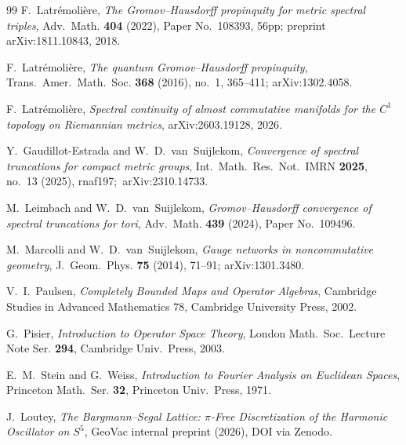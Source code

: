 \documentclass[11pt,a4paper]{article}
\theoremstyle{plain}
\theoremstyle{definition}
\begin{document}
\begin{thebibliography}{99}
F.~Latr\'emoli\`ere,
\newblock \emph{The Gromov--Hausdorff propinquity for metric spectral
triples},
\newblock Adv.~Math. \textbf{404} (2022), Paper No.~108393, 56pp;
\newblock preprint arXiv:1811.10843, 2018.

F.~Latr\'emoli\`ere,
\newblock \emph{The quantum Gromov--Hausdorff propinquity},
\newblock Trans.~Amer.~Math.~Soc. \textbf{368} (2016), no.~1, 365--411;
\newblock arXiv:1302.4058.

F.~Latr\'emoli\`ere,
\newblock \emph{Spectral continuity of almost commutative manifolds for
the $C^1$ topology on Riemannian metrics},
\newblock arXiv:2603.19128, 2026.

Y.~Gaudillot-Estrada and W.~D.~van~Suijlekom,
\newblock \emph{Convergence of spectral truncations for compact
metric groups},
\newblock Int.~Math.~Res.~Not.\ IMRN \textbf{2025}, no.~13 (2025),
rnaf197;\ arXiv:2310.14733.

M.~Leimbach and W.~D.~van~Suijlekom,
\newblock \emph{Gromov--Hausdorff convergence of spectral truncations
for tori},
\newblock Adv.~Math. \textbf{439} (2024), Paper No.~109496.

M.~Marcolli and W.~D.~van~Suijlekom,
\newblock \emph{Gauge networks in noncommutative geometry},
\newblock J.~Geom.~Phys. \textbf{75} (2014), 71--91;
\newblock arXiv:1301.3480.

V.~I.~Paulsen,
\newblock \emph{Completely Bounded Maps and Operator Algebras},
\newblock Cambridge Studies in Advanced Mathematics 78, Cambridge
University Press, 2002.

G.~Pisier,
\newblock \emph{Introduction to Operator Space Theory},
\newblock London Math.~Soc.~Lecture Note Ser. \textbf{294}, Cambridge
Univ.~Press, 2003.

E.~M.~Stein and G.~Weiss,
\newblock \emph{Introduction to Fourier Analysis on Euclidean Spaces},
\newblock Princeton Math.~Ser. \textbf{32}, Princeton Univ.~Press, 1971.

J.~Loutey,
\newblock \emph{The Bargmann--Segal Lattice: $\pi$-Free Discretization
of the Harmonic Oscillator on $S^5$},
\newblock GeoVac internal preprint (2026), DOI via Zenodo.


\end{thebibliography}
\end{document}
